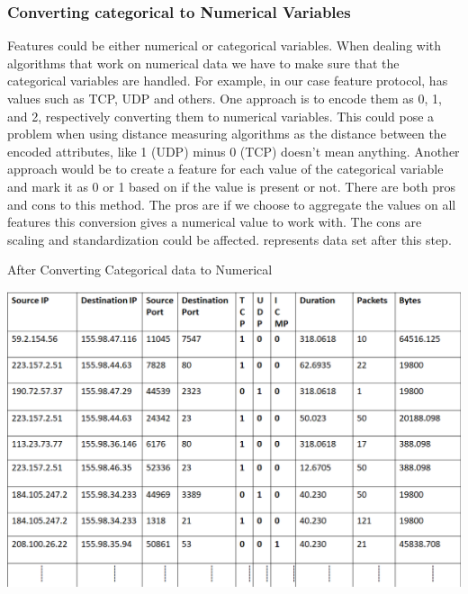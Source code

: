 \subsubsection{Converting categorical to Numerical Variables} 

Features could be either numerical or categorical variables. When dealing with algorithms that work on numerical data we have to make sure that the categorical variables are handled.
For example, in our case feature protocol, has values such as TCP, UDP and others. One approach is to encode them as 0, 1, and 2, respectively converting them to numerical variables. This could pose a problem when using distance measuring algorithms as the distance between the encoded attributes, like 1 (UDP) minus 0 (TCP) doesn't mean anything. Another approach would be to create a feature for each value of the categorical variable and mark it as 0 or 1 based on if the value is present or not. There are both pros and cons to this method. The pros are if we choose to aggregate the values on all features this conversion gives a numerical value to work with. The cons are scaling and standardization could be affected.  represents data set after this step.

\begin{table}[b]
	\caption{After Converting Categorical data to Numerical}%
	\centerline{\includegraphics[scale = 0.6]{categorical.png}}
\end{table}

